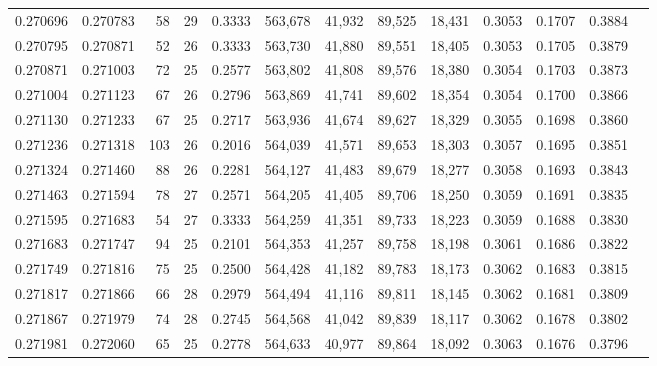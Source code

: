 \begin{tabular}{rrrrrrrrrrrrr}
0.270696 & 0.270783 &  58 &  29 &                                     0.3333 & 563,678 &  41,932 &  89,525 &  18,431 & 0.3053 & 0.1707 & 0.3884 \\
0.270795 & 0.270871 &  52 &  26 &                                     0.3333 & 563,730 &  41,880 &  89,551 &  18,405 & 0.3053 & 0.1705 & 0.3879 \\
0.270871 & 0.271003 &  72 &  25 &                                     0.2577 & 563,802 &  41,808 &  89,576 &  18,380 & 0.3054 & 0.1703 & 0.3873 \\
0.271004 & 0.271123 &  67 &  26 &                                     0.2796 & 563,869 &  41,741 &  89,602 &  18,354 & 0.3054 & 0.1700 & 0.3866 \\
0.271130 & 0.271233 &  67 &  25 &                                     0.2717 & 563,936 &  41,674 &  89,627 &  18,329 & 0.3055 & 0.1698 & 0.3860 \\
0.271236 & 0.271318 & 103 &  26 &                                     0.2016 & 564,039 &  41,571 &  89,653 &  18,303 & 0.3057 & 0.1695 & 0.3851 \\
0.271324 & 0.271460 &  88 &  26 &                                     0.2281 & 564,127 &  41,483 &  89,679 &  18,277 & 0.3058 & 0.1693 & 0.3843 \\
0.271463 & 0.271594 &  78 &  27 &                                     0.2571 & 564,205 &  41,405 &  89,706 &  18,250 & 0.3059 & 0.1691 & 0.3835 \\
0.271595 & 0.271683 &  54 &  27 &                                     0.3333 & 564,259 &  41,351 &  89,733 &  18,223 & 0.3059 & 0.1688 & 0.3830 \\
0.271683 & 0.271747 &  94 &  25 &                                     0.2101 & 564,353 &  41,257 &  89,758 &  18,198 & 0.3061 & 0.1686 & 0.3822 \\
0.271749 & 0.271816 &  75 &  25 &                                     0.2500 & 564,428 &  41,182 &  89,783 &  18,173 & 0.3062 & 0.1683 & 0.3815 \\
0.271817 & 0.271866 &  66 &  28 &                                     0.2979 & 564,494 &  41,116 &  89,811 &  18,145 & 0.3062 & 0.1681 & 0.3809 \\
0.271867 & 0.271979 &  74 &  28 &                                     0.2745 & 564,568 &  41,042 &  89,839 &  18,117 & 0.3062 & 0.1678 & 0.3802 \\
0.271981 & 0.272060 &  65 &  25 &                                     0.2778 & 564,633 &  40,977 &  89,864 &  18,092 & 0.3063 & 0.1676 & 0.3796 \\

\end{tabular}

